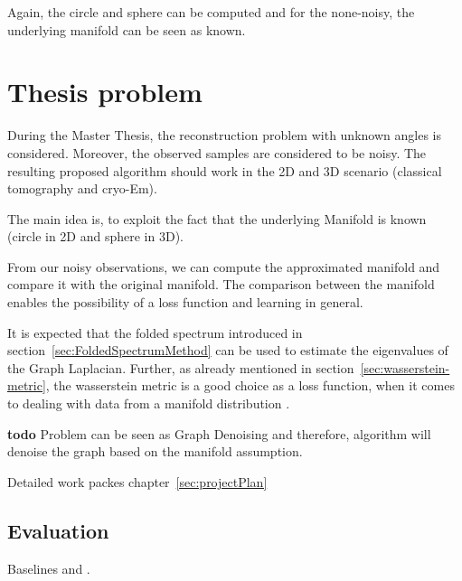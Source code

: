 Again, the circle and sphere can be computed and for the none-noisy, the underlying manifold can be seen as known.


\section{Thesis problem}
During the Master Thesis, the reconstruction problem with unknown angles is considered. 
Moreover, the observed samples are considered to be noisy. 
The resulting proposed algorithm should work in the 2D and 3D scenario (classical tomography and cryo-Em).

The main idea is, to exploit the fact that the underlying Manifold is known (circle in 2D and sphere in 3D). 

From our noisy observations, we can compute the approximated manifold and compare it with the original manifold.
The comparison between the manifold enables the possibility of a loss function and learning in general.


It is expected that the folded spectrum \cite{foldedSpectrumMethod} introduced in section~\ref{sec:FoldedSpectrumMethod}
can be used to estimate the eigenvalues of the Graph Laplacian.
Further, as already mentioned in section~\ref{sec:wasserstein-metric}, the wasserstein metric is a good choice
as a loss function, when it comes to dealing with data from a manifold distribution \cite{wassersteinGAN}. 


\textbf{todo}
Problem can be seen as Graph Denoising and therefore, algorithm 
will denoise the graph based on the manifold assumption.


Detailed work packes chapter~\ref{sec:projectPlan}

\subsection{Evaluation}

Baselines \cite{multiDiffusionMaps} and \cite{LaplaceRandomProjections}.


